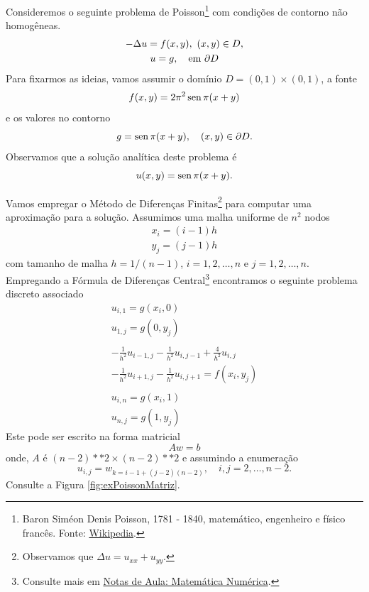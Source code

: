 \begin{exer}\label{exer:poissonDNH}
    Consideremos o seguinte problema de Poisson\footnote{Baron Siméon Denis Poisson, 1781 - 1840, matemático, engenheiro e físico francês. Fonte: \href{https://en.wikipedia.org/wiki/Sim\%C3\%A9on_Denis_Poisson}{Wikipedia}.} com condições de contorno não homogêneas.
  \begin{gather}
    - \Delta u = f(x,y),~(x, y)\in D,\\
    u = g, \quad\text{em }\partial D
  \end{gather}
  Para fixarmos as ideias, vamos assumir o domínio $D = (0,1)\times (0,1)$, a fonte
  \begin{equation}
    f(x,y) = 2\pi^2 \operatorname{sen} \pi (x+y)
  \end{equation}
  e os valores no contorno
  \begin{equation}
    g = \operatorname{sen} \pi(x+y),\quad (x,y)\in \partial D.
  \end{equation}
  Observamos que a solução analítica deste problema é
  \begin{equation}
    u(x,y) = \operatorname{sen} \pi(x+y).
  \end{equation}
  
  Vamos empregar o Método de Diferenças Finitas\footnote{Observamos que $\Delta u = u_{xx} + u_{yy}$.} para computar uma aproximação para a solução. Assumimos uma malha uniforme de $n^2$ nodos
  \begin{gather}
    x_i = (i-1)h\\
    y_j = (j-1)h
  \end{gather}
  com tamanho de malha $h = 1/(n-1)$, $i=1,2,\dotsc,n$ e $j=1,2,\dotsc,n$. Empregando a Fórmula de Diferenças Central\footnote{Consulte mais em \href{https://phkonzen.github.io/notas/MatematicaNumerica/cap_edp_sec_Poisson.html}{Notas de Aula: Matemática Numérica}.} encontramos o seguinte problema discreto associado
  \begin{gather}
    u_{i, 1} = g(x_i, 0)\\
    u_{1, j} = g(0, y_j)\\
    ~\nonumber\\
    - \frac{1}{h^2}u_{i-1,j} - \frac{1}{h^2}u_{i,j-1} + \frac{4}{h^2}u_{i,j} \nonumber\\
    - \frac{1}{h^2}u_{i+1,j} - \frac{1}{h^2}u_{i,j+1} = f(x_i, y_j)\\
    ~\nonumber\\
    u_{i,n} = g(x_i, 1)\\
    u_{n,j} = g(1, y_j)
  \end{gather}
  Este pode ser escrito na forma matricial
  \begin{equation}
    Aw = b
  \end{equation}
  onde, $A$ é $(n-2)**2\times (n-2)**2$ e assumindo a enumeração
  \begin{equation}
    u_{i,j} = w_{k=i-1 + (j-2)(n-2)},\quad i,j=2,\dotsc,n-2.
  \end{equation}
  Consulte a Figura \ref{fig:exPoissonMatriz}.


\end{exer}
